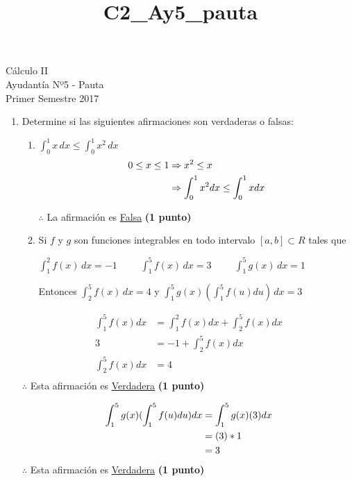 \documentclass[letterpaper,10pt]{article}
\title{C2_Ay5_pauta}
\newcommand{\dis}{\displaystyle}
\begin{document}
\begin{center}
Cálculo II\\
Ayudantía Nº5 - Pauta\\
Primer Semestre 2017
\end{center}



\begin{enumerate}
\item Determine si las siguientes afirmaciones son verdaderas o falsas:
\begin{enumerate}[label=\emph{\alph*)}]
\item $\dis \int_0^1 x\, dx \leq \int_0^1 x^2\, dx$ \\

\begin{align*}
 \dis  0 \leq x \leq 1  &\Rightarrow x^2 \leq x\\
 \dis &\Rightarrow \int_0^1 x^2 dx \leq \int_0^1 x dx
\end{align*}

$\therefore$ La afirmación es \underline{Falsa} \dotfill \textbf{(1 punto)}

\item Si $f$ y $g$ son funciones integrables en todo intervalo $[a,b] \subset R$ tales que
\begin{center}
$\dis \int_1^2 f(x)\, dx=-1  \hspace{1cm}  \int_1^5 f(x)\, dx=3 \hspace{1cm} \dis \int_1^5 g(x)\, dx=1 $
\end{center}
Entonces $\dis \int_2^5 f(x)\, dx=4$ \hspace{2mm} y \hspace{2mm} $\dis \int_1^5 g(x)\left(\int_1^5 f(u)du\right)  \, dx=3$
\end{enumerate}
\vspace{2mm}

\begin{align*}
 \dis  \int_1^5 f(x) dx  &= \int_1^2 f(x) dx + \int_2^5 f(x) dx\\
 \dis  3  &= -1 + \int_2^5 f(x) dx\\
 \dis  \int_2^5 f(x) dx  &= 4\\
\end{align*}
$\therefore$ Esta afirmación es \underline{Verdadera} \dotfill \textbf{(1 punto)}

\begin{align*}
 \dis  \int_1^5 g(x) (\int_1^5 f(u) du) dx  &= \int_1^5 g(x) (3) dx\\
 \dis   &=  (3) * 1\\
 \dis   &= 3\\
\end{align*}
$\therefore$ Esta afirmación es \underline{Verdadera} \dotfill \textbf{(1 punto)}


\end{enumerate}
\end{document}

